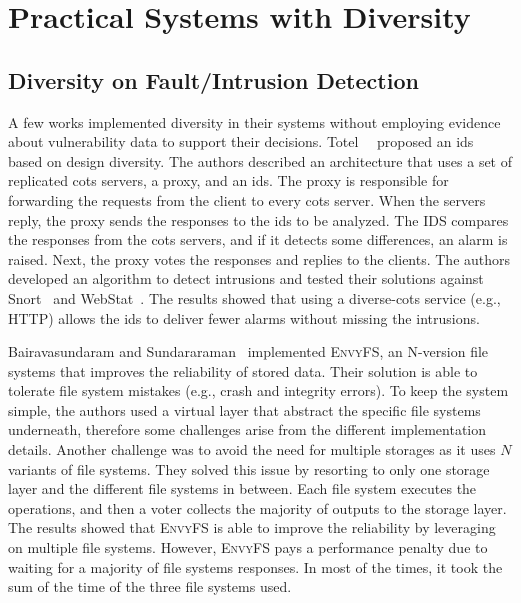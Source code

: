 \section{Practical Systems with Diversity}

\subsection{Diversity on Fault/Intrusion Detection}
A few works implemented diversity in their systems without employing evidence about vulnerability data to support their decisions.
Totel~\etal{}~\cite{Totel:2005} proposed an \gls{ids} based on design diversity.
The authors described an architecture that uses a set of replicated \gls{cots} servers, a proxy, and an \gls{ids}. 
The proxy is responsible for forwarding the requests from the client to every \gls{cots} server. 
When the servers reply, the proxy sends the responses to the \gls{ids} to be analyzed. 
The IDS compares the responses from the \gls{cots} servers, and if it detects some differences, an alarm is raised. 
Next, the proxy votes the responses and replies to the clients. 
The authors developed an algorithm to detect intrusions and tested their solutions against Snort~\cite{snort} and WebStat~\cite{Vigna:2003}. 
The results showed that using a diverse-\gls{cots} service (e.g., HTTP) allows the \gls{ids} to deliver fewer alarms without missing the intrusions.

Bairavasundaram and Sundararaman~\cite{Bairavasundaram:2009} implemented \textsc{EnvyFS}, an N-version file systems that improves the reliability of stored data.
Their solution is able to tolerate file system mistakes (e.g., crash and integrity errors). 
To keep the system simple, the authors used a virtual layer that abstract the specific file systems underneath, therefore some challenges arise from the different implementation details.
Another challenge was to avoid the need for multiple storages as it uses $N$ variants of file systems. 
They solved this issue by resorting to only one storage layer and the different file systems in between. 
Each file system executes the operations, and then a voter collects the majority of outputs to the storage layer.
The results showed that \textsc{EnvyFS} is able to improve the reliability by leveraging on multiple file systems.
However, \textsc{EnvyFS} pays a performance penalty due to waiting for a majority of file systems responses. 
In most of the times, it took the sum of the time of the three file systems used.


